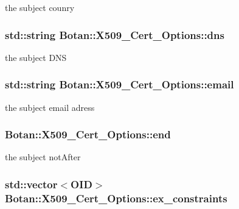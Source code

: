 the subject counry \hypertarget{classBotan_1_1X509__Cert__Options_a5f93a787b5f2bfc1a90952af1b675450}{
\subsubsection[{dns}]{\setlength{\rightskip}{0pt plus 5cm}std\-::string Botan\-::\-X509\-\_\-\-Cert\-\_\-\-Options\-::dns}}\label{classBotan_1_1X509__Cert__Options_a5f93a787b5f2bfc1a90952af1b675450}
the subject D\-N\-S \hypertarget{classBotan_1_1X509__Cert__Options_a5e6c6b3e639a65adae61d87c213756b4}{
\subsubsection[{email}]{\setlength{\rightskip}{0pt plus 5cm}std\-::string Botan\-::\-X509\-\_\-\-Cert\-\_\-\-Options\-::email}}\label{classBotan_1_1X509__Cert__Options_a5e6c6b3e639a65adae61d87c213756b4}
the subject email adress \hypertarget{classBotan_1_1X509__Cert__Options_a61812e17d190679ebb96649765f7a4ad}{
\subsubsection[{end}]{ Botan\-::\-X509\-\_\-\-Cert\-\_\-\-Options\-::end}}\label{classBotan_1_1X509__Cert__Options_a61812e17d190679ebb96649765f7a4ad}
the subject not\-After \hypertarget{classBotan_1_1X509__Cert__Options_a182b6d30f8ab5dea050ae02dcff6bbad}{
\subsubsection[{ex\-\_\-constraints}]{\setlength{\rightskip}{0pt plus 5cm}std\-::vector$<${\bf O\-I\-D}$>$ Botan\-::\-X509\-\_\-\-Cert\-\_\-\-Options\-::ex\-\_\-constraints}}\label{classBotan_1_1X509__Cert__Options_a182b6d30f8ab5dea050ae02dcff6bbad}
